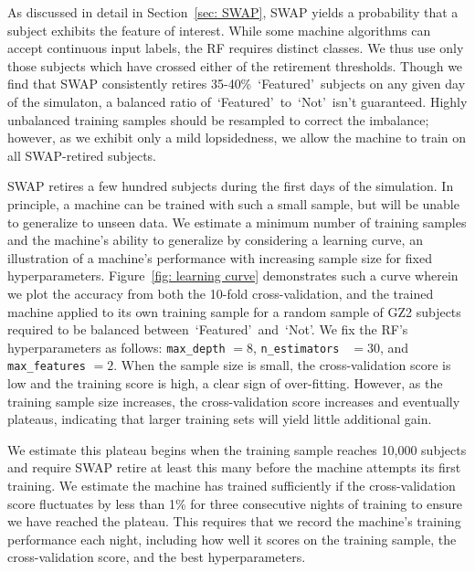 \documentclass[twocolumn, trackchanges, linenumbers]{aastex6}%
\newcommand{\feat}{`Featured'}
\newcommand{\notfeat}{`Not'}
\begin{document}
As discussed in detail in Section~\ref{sec: SWAP}, SWAP yields a probability that 
a subject exhibits the feature of interest. While some machine algorithms can 
accept continuous input labels, the RF requires distinct classes. We thus use only 
those subjects which have crossed either of the retirement thresholds. 
Though we find that SWAP consistently retires 35-40\%~\feat~subjects on 
any given day of the simulaton, a balanced ratio of~\feat~to~\notfeat~isn't guaranteed.
 Highly unbalanced training samples should be resampled to correct the imbalance; 
however, as we exhibit only a mild lopsidedness, we allow the machine to train on all 
SWAP-retired subjects.  

SWAP retires a few hundred subjects during the first days of the simulation.
In principle,  a machine can be trained with such a small sample, but will be unable
to generalize to unseen data. We estimate a minimum number of training samples
and the machine's ability to generalize by considering a learning curve, an illustration
of a machine's performance with increasing sample size for fixed hyperparameters. 
Figure~\ref{fig: learning curve} demonstrates such a curve wherein we plot
the accuracy from both the 10-fold cross-validation, and the trained machine
applied to its own training sample for a random sample of GZ2 subjects
required to be balanced between~\feat~and~\notfeat.  
We fix the RF's hyperparameters as follows: \texttt{max\_depth} $=8$, 
\texttt{n\_estimators } $=30$, and \texttt{max\_features} $=2$. 
When the sample size is small, the cross-validation score is low and the training 
score is high, a clear sign of over-fitting.  However, as the training 
sample size increases, the cross-validation score increases and eventually plateaus,
 indicating that larger training sets will yield little additional gain. 

We estimate this plateau begins when the training 
sample reaches 10,000 subjects and require SWAP retire at least this many 
 before the machine attempts its first training.  We estimate the machine 
has trained sufficiently if the cross-validation score fluctuates by less than 1\% 
for three consecutive nights of training to ensure we have reached the plateau.  
This requires that we record the machine's training performance each night, 
including how well it scores on the training sample, the 
cross-validation score, and the best hyperparameters. 
\end{document}
